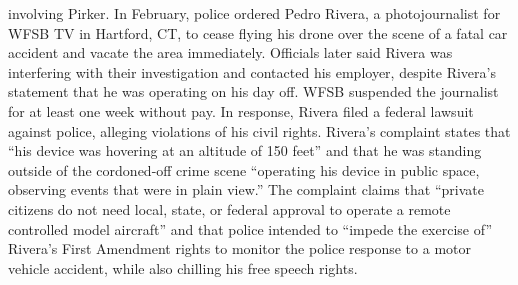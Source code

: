 \begin{itemize}
involving Pirker. In February, police ordered Pedro Rivera, a photojournalist
for WFSB TV in Hartford, CT, to cease flying his drone over the scene of a
fatal car accident and vacate the area immediately. Officials later said Rivera
was interfering with their investigation and contacted his employer, despite
Rivera's statement that he was operating on his day off. WFSB suspended
the journalist for at least one week without pay. In response, Rivera filed a
federal lawsuit against police, alleging violations of his civil rights.
Rivera's complaint states that ``his device was hovering at an altitude of 150
feet'' and that he was standing outside of the cordoned-off crime scene
``operating his device in public space, observing events that were in plain
view.'' The complaint claims that ``private citizens do not need local, state,
or federal approval to operate a remote controlled model aircraft'' and that
police intended to ``impede the exercise of'' Rivera's First Amendment rights
to monitor the police response to a motor vehicle accident, while also chilling
his free speech rights.


\end{itemize}
